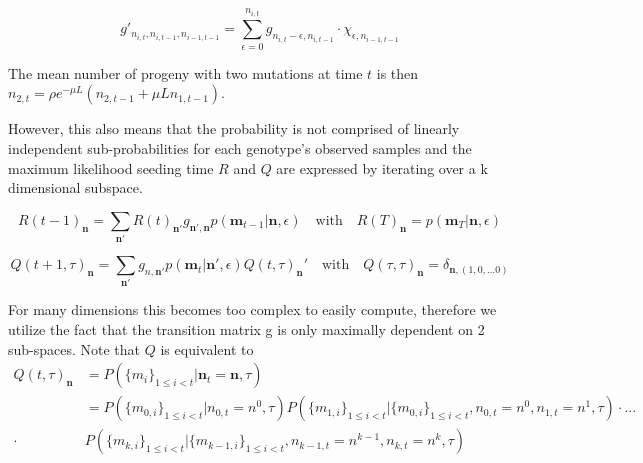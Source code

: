 \documentclass[aps,rmp, onecolumn]{revtex4}
\begin{document}
\begin{equation}
g'_{n_{i,t},n_{i,t-1}, n_{i-1,t-1}} = \sum_{\epsilon=0}^{n_{i,t}} g_{n_{i,t} - \epsilon,n_{i,t-1}} \cdot  \chi_{\epsilon, n_{i-1, t-1}}
\end{equation}

The mean number of progeny with two mutations  at time $t$ is then $n_{2,t} = \rho e^{-\mu L} (n_{2,t-1} + \mu L n_{1, t-1})$.

However, this also means that the probability is not comprised of linearly independent sub-probabilities for each genotype's observed samples and the maximum likelihood seeding time $R$ and $Q$ are expressed by iterating over a k dimensional subspace. 

\begin{equation}
    R(t-1)_{\textbf{n}} = \sum_{\textbf{n}'} R(t)_{\textbf{n}'} g_{\textbf{n}',\textbf{n}} p(\textbf{m}_{t-1}|\textbf{n},\epsilon) \quad \mathrm{with} \quad R(T)_\textbf{n} = p(\textbf{m}_{T}|\textbf{n},\epsilon)
\end{equation}

\begin{equation}
    Q(t+1,\tau)_{\textbf{n}} = \sum_{\textbf{n}'} g_{n,\textbf{n}'} p(\textbf{m}_t|\textbf{n}',\epsilon) Q(t,\tau)_{\textbf{n}}'  \quad \mathrm{with} \quad Q(\tau,\tau)_{\textbf{n}} = \delta_{{\textbf{n}},(1,0,... 0)}
\end{equation}

For many dimensions this becomes too complex to easily compute, therefore we utilize the fact that the transition matrix g is only maximally dependent on 2 sub-spaces. Note that $Q$ is equivalent to 
\begin{equation}
\begin{split}
    Q(t,\tau)_{\textbf{n}} &= P(\{m_i\}_{1 \leq i<t} | \textbf{n}_t = \textbf{n}, \tau) \\
    & = P(\{m_{0,i}\}_{1 \leq i<t} | n_{0,t} = n^0, \tau) P(\{m_{1,i}\}_{1 \leq i<t} | \{m_{0,i}\}_{1 \leq i<t}, n_{0,t} = n^0, n_{1,t} = n^1, \tau) \cdot ...\\ \cdot & P(\{m_{k,i}\}_{1 \leq i<t} | \{m_{k-1,i}\}_{1 \leq i<t}, n_{k-1, t} = n^{k-1}, n_{k,t} = n^k, \tau)
    \end{split}
\end{equation}
\end{document}
